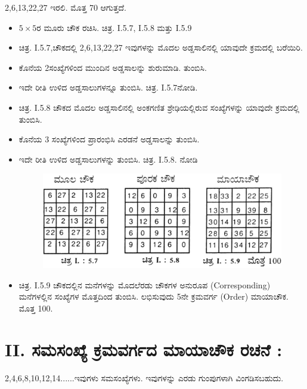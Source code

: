 2,6,13,22,27 ಇರಲಿ. ಮೊತ್ತ 70 ಆಗುತ್ತದೆ.
\begin{itemize}
	\item $5 \times 5$ರ ಮೂರು ಚೌಕ ರಚಿಸಿ. ಚಿತ್ರ. I.5.7, I.5.8 ಮತ್ತು I.5.9
	\item ಚಿತ್ರ. I.5.7,ಚೌಕದಲ್ಲಿ 2,6,13,22,27 ಇವುಗಳನ್ನು ಮೊದಲ ಅಡ್ಡಸಾಲಿನಲ್ಲಿ \hbox{ಯಾವುದೇ} ಕ್ರಮದಲ್ಲಿ ಬರೆಯಿರಿ.
	\item ಕೊನೆಯ 2ಸಂಖ್ಯೆಗಳಿಂದ ಮುಂದಿನ ಅಡ್ಡಸಾಲನ್ನು ಶುರುಮಾಡಿ. ತುಂಬಿಸಿ.
	\item ಇದೇ ರೀತಿ ಉಳಿದ ಅಡ್ಡಸಾಲುಗಳನ್ನೂ ತುಂಬಿಸಿ. ಚಿತ್ರ. I.5.7ನೋಡಿ.
	\item ಚಿತ್ರ. I.5.8 ಚೌಕದ ಮೊದಲ ಅಡ್ಡಸಾಲಿನಲ್ಲಿ ಅಂಕಗಣಿತ ಶ್ರೇಢಿಯಲ್ಲಿರುವ ಸಂಖ್ಯೆಗಳನ್ನು ಯಾವುದೇ ಕ್ರಮದಲ್ಲಿ ತುಂಬಿಸಿ.
	\item ಕೊನೆಯ 3 ಸಂಖ್ಯೆಗಳಿಂದ ಪ್ರಾರಂಭಿಸಿ ಎರಡನೆ ಅಡ್ಡಸಾಲನ್ನು ತುಂಬಿಸಿ.
	\item ಇದೇ ರೀತಿ ಉಳಿದ ಅಡ್ಡಸಾಲುಗಳನ್ನು ತುಂಬಿಸಿ. ಚಿತ್ರ. I.5.8. ನೋಡಿ
	\begin{figure}[H]
	\includegraphics{src/figures/chap3/fig3-13.jpg}
	\end{figure}
	\item ಚಿತ್ರ. I.5.9 ಚೌಕದಲ್ಲಿನ ಮನೆಗಳನ್ನು ಮೊದಲೆರಡು ಚೌಕಗಳ ಅನುರೂಪ (Corresponding) ಮನೆಗಳಲ್ಲಿನ ಸಂಖ್ಯೆಗಳ ಮೊತ್ತದಿಂದ ತುಂಬಿಸಿ. \hbox{ಲಭಿಸುವುದು} 5ನೇ ಕ್ರಮವರ್ಗ (Order) ಮಾಯಾಚೌಕ. ಮೊತ್ತ 100.
\end{itemize}

\section*{II. ಸಮಸಂಖ್ಯೆ ಕ್ರಮವರ್ಗದ ಮಾಯಾಚೌಕ ರಚನೆ :}

2,4,6,8,10,12,14......ಇವುಗಳು ಸಮಸಂಖ್ಯೆಗಳು. ಇವುಗಳನ್ನು ಎರಡು ಗುಂಪುಗಳಾಗಿ ವಿಂಗಡಿಸಬಹುದು.

